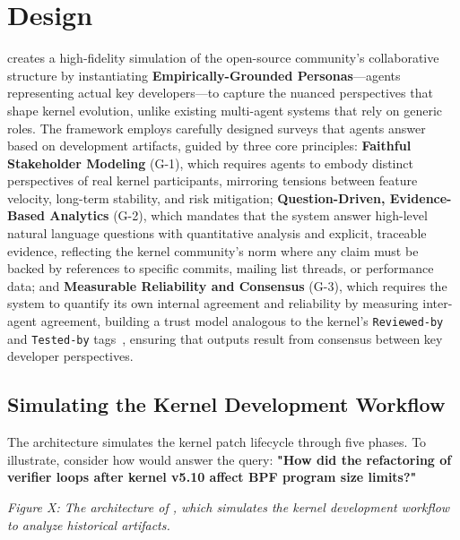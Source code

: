 
\section{Design}
\label{sec:design}

\sys creates a high-fidelity simulation of the open-source community's collaborative structure by instantiating \textbf{Empirically-Grounded Personas}—agents representing actual key developers—to capture the nuanced perspectives that shape kernel evolution, unlike existing multi-agent systems that rely on generic roles. The framework employs carefully designed surveys that agents answer based on development artifacts, guided by three core principles: \textbf{Faithful Stakeholder Modeling} (G-1), which requires agents to embody distinct perspectives of real kernel participants, mirroring tensions between feature velocity, long-term stability, and risk mitigation; \textbf{Question-Driven, Evidence-Based Analytics} (G-2), which mandates that the system answer high-level natural language questions with quantitative analysis and explicit, traceable evidence, reflecting the kernel community's norm where any claim must be backed by references to specific commits, mailing list threads, or performance data; and \textbf{Measurable Reliability and Consensus} (G-3), which requires the system to quantify its own internal agreement and reliability by measuring inter-agent agreement, building a trust model analogous to the kernel's \texttt{Reviewed-by} and \texttt{Tested-by} tags~\cite{kerneldocs-submitting}, ensuring that outputs result from consensus between key developer perspectives.


\subsection{Simulating the Kernel Development Workflow}

The \sys architecture simulates the kernel patch lifecycle through five phases. To illustrate, consider how \sys would answer the query: \textbf{"How did the refactoring of verifier loops after kernel v5.10 affect BPF program size limits?"}

\emph{Figure X: The architecture of \sys, which simulates the kernel development workflow to analyze historical artifacts.}

